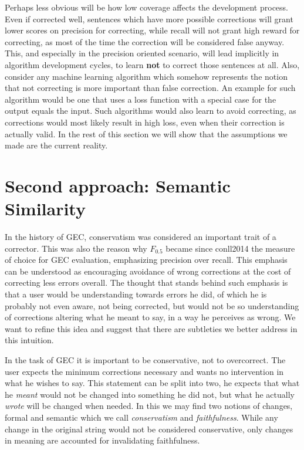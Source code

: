 \documentclass[english]{article}
\begin{document}
Perhaps less obvious will be how low coverage affects the development
process. Even if corrected well, sentences which have more possible
corrections will grant lower scores on precision for correcting, while recall will not grant high reward for correcting, as most of the time the correction will be considered false anyway. This, and especially in the precision oriented scenario, will lead implicitly in algorithm development cycles, to learn \textbf{not} to correct those sentences at all. Also, consider any machine learning algorithm which somehow represents the notion that not correcting is more important than false correction. An example for such algorithm would be one that uses a loss function with a special case for the output equals the input. Such algorithms would also learn to avoid correcting, as corrections would most likely result in high loss, even when their correction is actually valid.
In the rest of this section we will show that the assumptions we made are the current reality. 


\section{Second approach: Semantic Similarity\label{sec:Semantics}}

In the history of GEC, conservatism was considered an
important trait of a corrector\cite{brockett2006correcting}.
This was also the reason why $F_{0.5}$ became since conll2014\cite{ng2014conll}
the measure of choice for GEC evaluation, emphasizing
precision over recall. This emphasis can be understood as encouraging
avoidance of wrong corrections at the cost of correcting less errors
overall. The thought that stands behind such emphasis is that a user
would be understanding towards errors he did, of which he is probably
not even aware, not being corrected, but would not be so understanding
of corrections altering what he meant to say, in a way he perceives as wrong. We want to refine
this idea and suggest that there are subtleties we better address
in this intuition.

In the task of GEC it is important to be
conservative, not to overcorrect. The user expects the minimum corrections
necessary and wants no intervention in what he wishes to say. This statement can be split into two, he expects that what he \emph{meant} would not be changed
into something he did not, but what he actually \emph{wrote} will be changed when needed. In this we may find two notions of changes,
formal and semantic which we call \textit{conservatism} and \textit{faithfulness}. While any change in
the original string would not be considered conservative, only
changes in meaning are accounted for invalidating faithfulness. 
\end{document}
